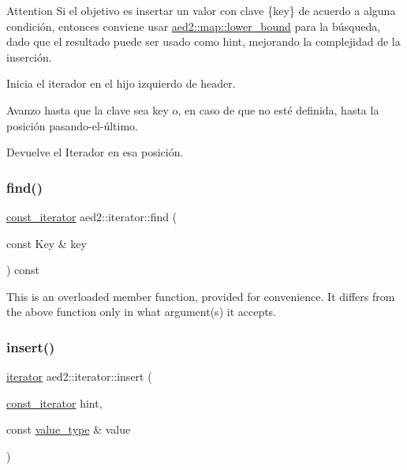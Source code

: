 \begin{DoxyAttention}{Attention}
Si el objetivo es insertar un valor con clave \{key\} de acuerdo a alguna condición, entonces conviene usar \hyperlink{classaed2_1_1map_a62075a47afdf89267c5462f88164af3d}{aed2\+::map\+::lower\+\_\+bound} para la búsqueda, dado que el resultado puede ser usado como hint, mejorando la complejidad de la inserción.
\begin{DoxyItemize}
\item Inicia el iterador en el hijo izquierdo de header.
\item Avanzo hasta que la clave sea key o, en caso de que no esté definida, hasta la posición pasando-\/el-\/último.
\item Devuelve el Iterador en esa posición. 
\end{DoxyItemize}
\end{DoxyAttention}
\mbox{\label{classaed2_1_1iterator_a21b4a52c60fc70ef482e174325e8fec5}} 
\subsubsection{\texorpdfstring{find()}{find()}\hspace{0.1cm}{\footnotesize\ttfamily [2/2]}}
{\footnotesize\ttfamily \hyperlink{classaed2_1_1iterator_1_1const__iterator}{const\+\_\+iterator} aed2\+::iterator\+::find (\begin{DoxyParamCaption}\item[{const Key \&}]{key }\end{DoxyParamCaption}) const\hspace{0.3cm}{\ttfamily [inline]}}

This is an overloaded member function, provided for convenience. It differs from the above function only in what argument(s) it accepts. \mbox{\label{classaed2_1_1iterator_ab9446668ad5619115b6c4a10eac83d68}} 
\subsubsection{\texorpdfstring{insert()}{insert()}\hspace{0.1cm}{\footnotesize\ttfamily [1/2]}}
{\footnotesize\ttfamily \hyperlink{classaed2_1_1iterator_1_1iterator}{iterator} aed2\+::iterator\+::insert (\begin{DoxyParamCaption}\item[{\hyperlink{classaed2_1_1iterator_1_1const__iterator}{const\+\_\+iterator}}]{hint,  }\item[{const \hyperlink{classaed2_1_1iterator_a6411a2c08b2b7c52f063bef1a168acb6}{value\+\_\+type} \&}]{value }\end{DoxyParamCaption})\hspace{0.3cm}{\ttfamily [inline]}}




